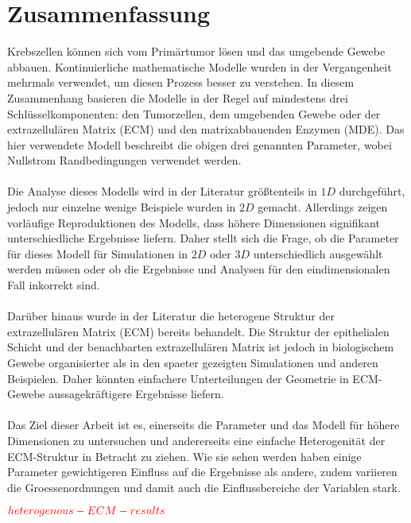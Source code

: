 \section*{Zusammenfassung}

Krebszellen können sich vom Primärtumor lösen und das umgebende Gewebe abbauen. 
Kontinuierliche mathematische Modelle wurden in der Vergangenheit mehrmals verwendet, um diesen Prozess besser zu verstehen. In diesem Zusammenhang basieren die Modelle in der Regel auf mindestens drei Schlüsselkomponenten: den Tumorzellen, dem umgebenden Gewebe oder der extrazellulären Matrix (ECM) und den matrixabbauenden Enzymen (MDE). Das hier verwendete Modell beschreibt die obigen drei genannten Parameter, wobei Nullstrom Randbedingungen verwendet werden. \\ \\
Die Analyse dieses Modells wird in der Literatur größtenteils in $1D$ durchgeführt, jedoch nur einzelne wenige Beispiele wurden in $2D$ gemacht. Allerdings zeigen vorläufige Reproduktionen des Modells, dass höhere Dimensionen signifikant unterschiedliche 
Ergebnisse liefern.
Daher stellt sich die Frage, ob die Parameter für dieses Modell für Simulationen in $2D$ oder $3D$ unterschiedlich ausgewählt werden müssen oder ob die Ergebnisse und Analysen für den eindimensionalen Fall inkorrekt sind. \\ \\
Darüber hinaus wurde in der Literatur die heterogene Struktur der extrazellulären Matrix (ECM) bereits behandelt. Die Struktur der epithelialen Schicht und der benachbarten extrazellulären Matrix ist jedoch in biologischem Gewebe organisierter als in den spaeter gezeigten Simulationen und anderen Beispielen. Daher könnten einfachere Unterteilungen der Geometrie in ECM-Gewebe aussagekräftigere Ergebnisse liefern. \\ \\
Das Ziel dieser Arbeit ist es, einerseits die Parameter und das Modell für höhere Dimensionen zu untersuchen und andererseits eine einfache Heterogenität der ECM-Struktur 
in Betracht zu ziehen. Wie sie sehen werden haben einige Parameter gewichtigeren Einfluss auf die Ergebnisse als andere, zudem variieren die Groessenordnungen und damit auch die Einflussbereiche der Variablen stark.

$\textcolor{red}{heterogenous-ECM-results}$

\clearpage
